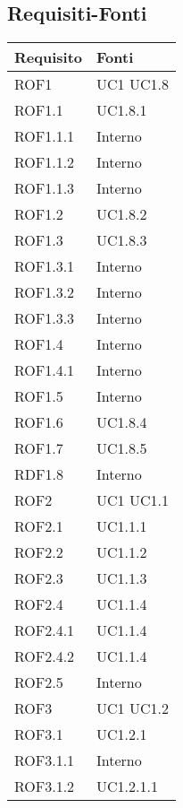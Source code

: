 \subsection{Requisiti-Fonti} %
\label{ssub:requisiti_fonti}
\begin{center}
\def\arraystretch{1.5}
\bgroup
\begin{longtable}{| p{4cm} | p{4cm} |}
\hline
\textbf{Requisito} & \textbf{Fonti} \\
\hline
ROF1   &  UC1 \newline UC1.8 \\
\hline
ROF1.1   &  UC1.8.1 \\
\hline
ROF1.1.1   &  Interno \\
\hline
ROF1.1.2   &  Interno \\
\hline
ROF1.1.3   &  Interno \\
\hline
ROF1.2   &  UC1.8.2 \\
\hline
ROF1.3   &  UC1.8.3 \\
\hline
ROF1.3.1   &  Interno \\
\hline
ROF1.3.2   &  Interno \\
\hline
ROF1.3.3   &  Interno \\
\hline
ROF1.4   &  Interno \\
\hline
ROF1.4.1   &  Interno \\
\hline
ROF1.5   &  Interno \\
\hline
ROF1.6   &  UC1.8.4 \\
\hline
ROF1.7   &  UC1.8.5 \\
\hline
RDF1.8   &  Interno \\
\hline
ROF2   &  UC1 \newline UC1.1 \\
\hline
ROF2.1   &  UC1.1.1 \\
\hline
ROF2.2   &  UC1.1.2 \\
\hline
ROF2.3   &  UC1.1.3 \\
\hline
ROF2.4   &  UC1.1.4 \\
\hline
ROF2.4.1   &  UC1.1.4 \\
\hline
ROF2.4.2   &  UC1.1.4 \\
\hline
ROF2.5   &  Interno  \\
\hline
ROF3   &  UC1 \newline UC1.2 \\
\hline
ROF3.1   &  UC1.2.1 \\
\hline
ROF3.1.1   &  Interno \\
\hline
ROF3.1.2   &  UC1.2.1.1 \\

\end{longtable}
\end{center}
